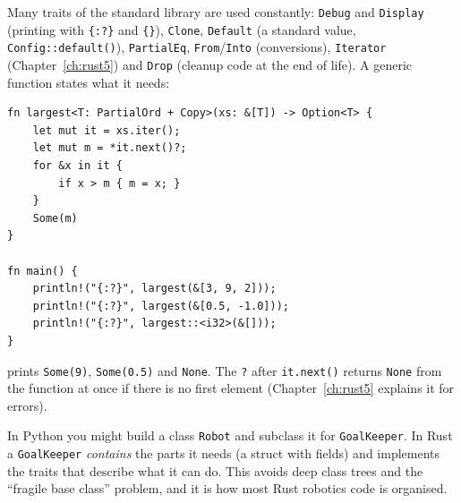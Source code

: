 Many traits of the standard library are used constantly: \verb!Debug! and \verb!Display! (printing with \verb!{:?}! and \verb!{}!), \verb!Clone!, \verb!Default! (a standard value, \verb!Config::default()!), \verb!PartialEq!, \verb!From!/\verb!Into! (conversions), \verb!Iterator! (Chapter~\ref{ch:rust5}) and \verb!Drop! (cleanup code at the end of life). A generic function states what it needs:
\begin{verbatim}
fn largest<T: PartialOrd + Copy>(xs: &[T]) -> Option<T> {
    let mut it = xs.iter();
    let mut m = *it.next()?;
    for &x in it {
        if x > m { m = x; }
    }
    Some(m)
}

fn main() {
    println!("{:?}", largest(&[3, 9, 2]));
    println!("{:?}", largest(&[0.5, -1.0]));
    println!("{:?}", largest::<i32>(&[]));
}
\end{verbatim}
prints \verb!Some(9)!, \verb!Some(0.5)! and \verb!None!. The \verb!?! after \verb!it.next()! returns \verb!None! from the function at once if there is no first element (Chapter~\ref{ch:rust5} explains it for errors).

\begin{aibox}
In Python you might build a class \verb!Robot! and subclass it for \verb!GoalKeeper!. In Rust a \verb!GoalKeeper! \emph{contains} the parts it needs (a struct with fields) and implements the traits that describe what it can do. This avoids deep class trees and the ``fragile base class'' problem, and it is how most Rust robotics code is organised.
\end{aibox}

